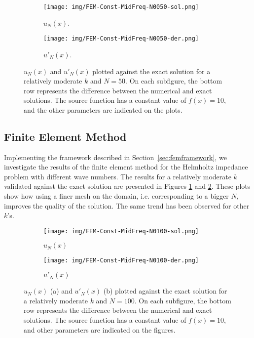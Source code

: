 \begin{figure}[h!]
    \centering
    \begin{subfigure}[b]{0.7\textwidth}
        \texttt{[image: img/FEM-Const-MidFreq-N0050-sol.png]}
        \caption{$u_N(x)$.}
    \end{subfigure}
    \vfill
    \begin{subfigure}[b]{0.7\textwidth}
        \texttt{[image: img/FEM-Const-MidFreq-N0050-der.png]}
        \caption{$u'_N(x)$.}
    \end{subfigure}
    \caption{$u_N(x)$ and $u'_N(x)$ plotted against the exact solution for a relatively moderate $k$ and $N=50$. On each subfigure, the bottom row represents the difference between the numerical and exact solutions. The source function has a constant value of $f(x)=10$, and the other parameters are indicated on the plots.}
    \label{fig:femMidfreqN050}
\end{figure}

\subsection{Finite Element Method}\label{sec:femresults}
Implementing the framework described in Section~\ref{sec:femframework}, we investigate the results of the finite element method for the Helmholtz impedance problem with different wave numbers. The results for a relatively moderate $k$ validated against the exact solution are presented in Figures \ref{fig:femMidfreqN050} and \ref{fig:femMidfreqN100}. These plots show how using a finer mesh on the domain, i.e. corresponding to a bigger $N$, improves the quality of the solution. The same trend has been observed for other $k$'s.

\begin{figure}[h!]
    \centering
    \begin{subfigure}[b]{0.7\textwidth}
        \texttt{[image: img/FEM-Const-MidFreq-N0100-sol.png]}
        \caption{$u_N(x)$}
    \end{subfigure}
    \vfill
    \begin{subfigure}[b]{0.7\textwidth}
        \texttt{[image: img/FEM-Const-MidFreq-N0100-der.png]}
        \caption{$u'_N(x)$}
    \end{subfigure}
    \caption{$u_N(x)$ (a) and $u'_N(x)$ (b) plotted against the exact solution for a relatively moderate $k$ and $N=100$. On each subfigure, the bottom row represents the difference between the numerical and exact solutions. The source function has a constant value of $f(x)=10$, and other parameters are indicated on the figures.}
    \label{fig:femMidfreqN100}
\end{figure}

